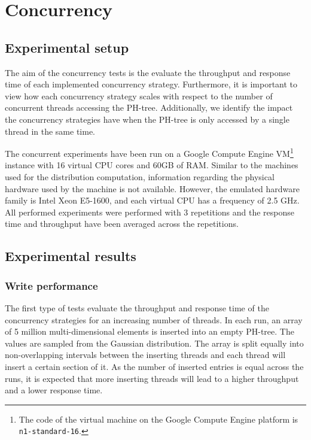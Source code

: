 \documentclass[11pt,a4paper]{globis-book}
\begin{document}
\section{Concurrency}
\label{sec:evaluation-concurrency}

\subsection{Experimental setup}
\label{subsec:exp-conc}
The aim of the concurrency tests is the evaluate the throughput and response time of each implemented concurrency strategy. Furthermore, it is important to view how each concurrency strategy scales with respect to the number of concurrent threads accessing the PH-tree. Additionally, we identify the impact the concurrency strategies have when the PH-tree is only accessed by a single thread in the same time.

The concurrent experiments have been run on a Google Compute Engine VM\footnote{The code of the virtual machine on the Google Compute Engine platform is \texttt{n1-standard-16}.} instance with 16 virtual CPU cores and 60GB of RAM. Similar to the machines used for the distribution computation, information regarding the physical hardware used by the machine is not available. However, the emulated hardware family is Intel Xeon E5-1600, and each virtual CPU has a frequency of 2.5 GHz. All performed experiments were performed with 3 repetitions and the response time and throughput have been averaged across the repetitions. 

\subsection{Experimental results}
\subsubsection{Write performance}

The first type of tests evaluate the throughput and response time of the concurrency strategies for an increasing number of threads. In each run, an array of 5 million multi-dimensional elements is inserted into an empty PH-tree. The values are sampled from the Gaussian distribution. The array is split equally into non-overlapping intervals between the inserting threads and each thread will insert a certain section of it. As the number of inserted entries is equal across the runs, it is expected that more inserting threads will lead to a higher throughput and a lower response time.
\end{document}
